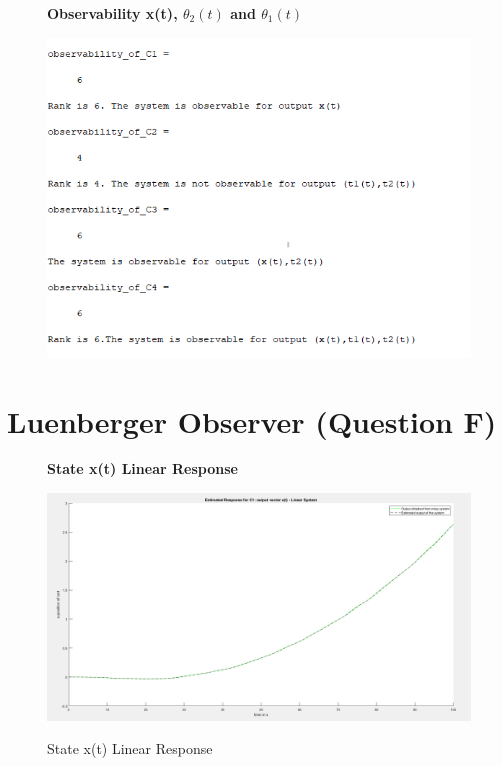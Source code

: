 \documentclass[12pt]{article}
\begin{document}
\begin{figure}[H]
    \centering
    \textbf{Observability x(t), $\theta_2(t)$ and $\theta_1(t)$ }\par\medskip
    \includegraphics[scale = 0.8]{out.png}\\[0.0 cm]	%
\end{figure}
\section{Luenberger Observer (Question F)}
\begin{figure}[H]
    \centering
    \textbf{State x(t) Linear Response}\par\medskip
    \includegraphics[scale = 0.35]{StateXlinearResponse.png}\\[0.0 cm]	%
    \caption{State x(t) Linear Response} 
\end{figure}
\end{document}
